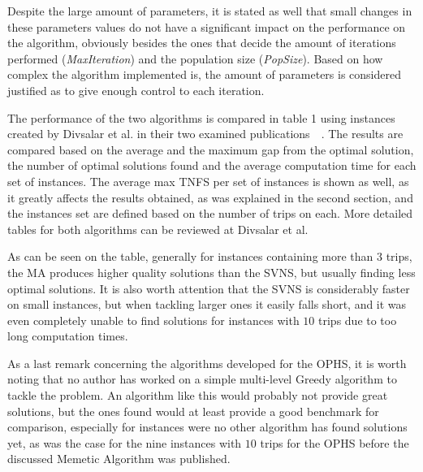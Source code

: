     Despite the large amount of parameters, it is stated as well that small changes in these parameters values do not have a significant impact on the performance on the algorithm, obviously besides the ones that decide the amount of iterations performed (\textit{MaxIteration}) and the population size (\textit{PopSize}). Based on how complex the algorithm implemented is, the amount of parameters is considered justified as to give enough control to each iteration.
    
    The performance of the two algorithms is compared in table 1 using instances created by Divsalar et al. in their two examined publications~\cite{divsalar2013}~\cite{divsalar2014}. The results are compared based on the average and the maximum gap from the optimal solution, the number of optimal solutions found and the average computation time for each set of instances. The average max TNFS per set of instances is shown as well, as it greatly affects the results obtained, as was explained in the second section, and the instances set are defined based on the number of trips on each. More detailed tables for both algorithms can be reviewed at Divsalar et al.~\cite{divsalar2014}
    
    As can be seen on the table, generally for instances containing more than $3$ trips, the MA produces higher quality solutions than the SVNS, but usually finding less optimal solutions. It is also worth attention that the SVNS is considerably faster on small instances, but when tackling larger ones it easily falls short, and it was even completely unable to find solutions for instances with $10$ trips due to too long computation times.
    
    As a last remark concerning the algorithms developed for the OPHS, it is worth noting that no author has worked on a simple multi-level Greedy algorithm to tackle the problem. An algorithm like this would probably not provide great solutions, but the ones found would at least provide a good benchmark for comparison, especially for instances were no other algorithm has found solutions yet, as was the case for the nine instances with $10$ trips for the OPHS before the discussed Memetic Algorithm was published.
    
